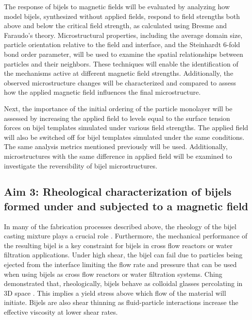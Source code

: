 The response of bijels to magnetic fields will be evaluated by analyzing how model bijels, synthesized without applied fields, respond to field 
strengths both above and below the critical field strength, as calculated using Bresme and Faraudo's theory. Microstructural properties, including the 
average domain size, particle orientation relative to the field and interface, and the Steinhardt 6-fold bond order parameter, will be used to examine 
the spatial relationships between particles and their neighbors. These techniques will enable the identification of the mechanisms active at different 
magnetic field strengths. Additionally, the observed microstructure changes will be characterized and compared to assess how the applied magnetic field 
influences the final microstructure.

Next, the importance of the initial ordering of the particle monolayer will be assessed by increasing the applied field to levels equal to the surface 
tension forces on bijel templates simulated under various field strengths. The applied field will also be switched off for bijel templates simulated under 
the same conditions. The same analysis metrics mentioned previously will be used. Additionally, microstructures with the same difference in applied field 
will be examined to investigate the reversibility of bijel microstructures.

\subsection{Aim 3: Rheological characterization of bijels formed under and subjected to a magnetic field}
\label{section:aim3_desc}

In many of the fabrication processes described above, the rheology of the bijel casting mixture plays a crucial role 
\cite{haase_continuous_2015, cai_bijels_2017, amirfattahi_fabrication_2024}. Furthermore, the mechanical performance of the
resulting bijel is a key constraint for bijels in cross flow reactors or water filtration applications. \cite{boakye-ansah_controlling_2020}
Under high shear, the bijel can fail due to particles being ejected from the interface limiting the flow rate and pressure that can
be used when using bijels as cross flow reactors or water filtration systems. Ching demonstrated that, rheologically, bijels behave 
as colloidal glasses percolating in 3D space \cite{ching_bijel_2022}. This implies a yield stress above which flow of the material
will initiate. Bijels are also shear thinning as fluid-particle interactions increase the effective viscosity at lower shear rates.



